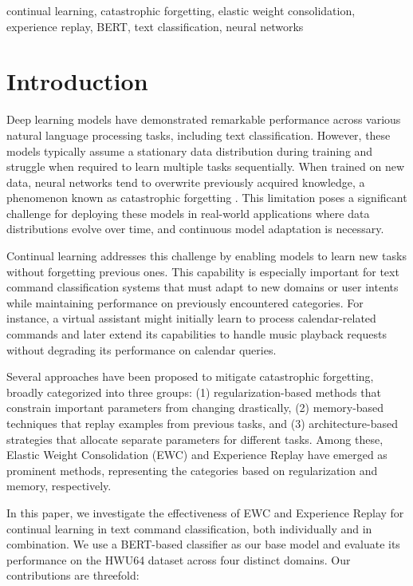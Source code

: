 \documentclass[conference]{IEEEtran}
\begin{document}
\begin{IEEEkeywords}
continual learning, catastrophic forgetting, elastic weight consolidation, experience replay, BERT, text classification, neural networks
\end{IEEEkeywords}

\section{Introduction}
Deep learning models have demonstrated remarkable performance across various natural language processing tasks, including text classification. However, these models typically assume a stationary data distribution during training and struggle when required to learn multiple tasks sequentially. When trained on new data, neural networks tend to overwrite previously acquired knowledge, a phenomenon known as catastrophic forgetting \cite{b1}. This limitation poses a significant challenge for deploying these models in real-world applications where data distributions evolve over time, and continuous model adaptation is necessary.

Continual learning addresses this challenge by enabling models to learn new tasks without forgetting previous ones. This capability is especially important for text command classification systems that must adapt to new domains or user intents while maintaining performance on previously encountered categories. For instance, a virtual assistant might initially learn to process calendar-related commands and later extend its capabilities to handle music playback requests without degrading its performance on calendar queries.

Several approaches have been proposed to mitigate catastrophic forgetting, broadly categorized into three groups: (1) regularization-based methods that constrain important parameters from changing drastically, (2) memory-based techniques that replay examples from previous tasks, and (3) architecture-based strategies that allocate separate parameters for different tasks. Among these, Elastic Weight Consolidation (EWC) \cite{b1} and Experience Replay \cite{b6} have emerged as prominent methods, representing the categories based on regularization and memory, respectively.

In this paper, we investigate the effectiveness of EWC and Experience Replay for continual learning in text command classification, both individually and in combination. We use a BERT-based classifier \cite{b7} as our base model and evaluate its performance on the HWU64 dataset across four distinct domains. Our contributions are threefold:
\end{document}
